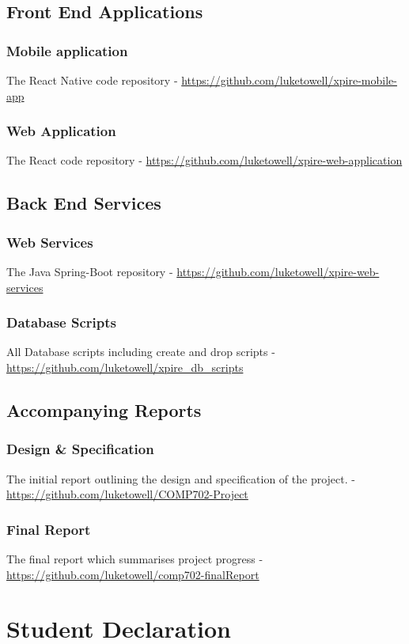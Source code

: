 \documentclass[a4paper,11pt]{report}
\begin{document}
\section*{Front End Applications}
\subsection*{Mobile application}
The React Native code repository - \url{https://github.com/luketowell/xpire-mobile-app}
\subsection*{Web Application}
The React code repository - \url{https://github.com/luketowell/xpire-web-application}

\section*{Back End Services}
\subsection*{Web Services}
The Java Spring-Boot repository - \url{https://github.com/luketowell/xpire-web-services}
\subsection*{Database Scripts}
All Database scripts including create and drop scripts - \url{https://github.com/luketowell/xpire_db_scripts}

\section*{Accompanying Reports}
\subsection*{Design \& Specification}
The initial report outlining the design and specification of the project. - \url{https://github.com/luketowell/COMP702-Project}
\subsection*{Final Report}
The final report which summarises project progress - \url{https://github.com/luketowell/comp702-finalReport}

\chapter*{\center Student Declaration} 
\end{document}
